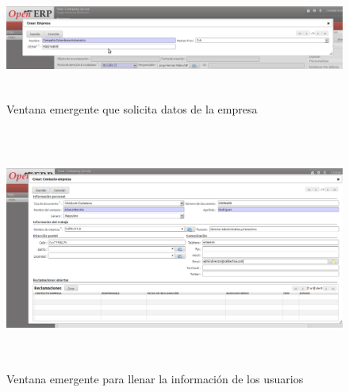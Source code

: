 \begin{figure}
 \centering
 \includegraphics[width=17cm,height=4cm]{./Imagenes/pantempresa.png}
 \caption{Ventana emergente que solicita datos de la empresa}
 \label{fig:pantempresa}
\end{figure}


\begin{figure}
 \centering
 \includegraphics[width=18cm,height=8cm]{./Imagenes/formusuario.png}
 \caption{Ventana emergente para llenar la información de los usuarios}
 \label{fig:formusuario}
\end{figure}